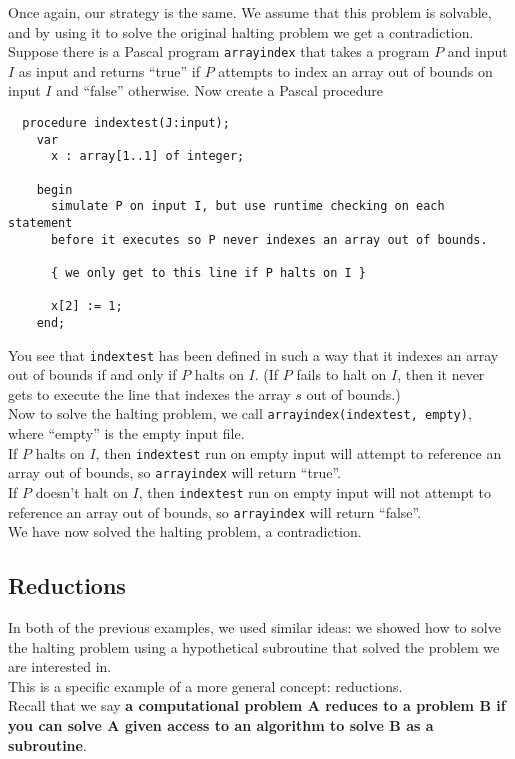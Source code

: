 \documentclass[12pt]{article}
\theoremstyle{plain}
\theoremstyle{definition}
\begin{document}
Once again, our strategy is the same.
We assume that this problem is solvable, and by using it to solve the original halting problem we get a contradiction.
Suppose there is a Pascal program \texttt{arrayindex} that takes a program $P$ and input $I$ as input and returns ``true'' if $P$ attempts to index an array out of bounds on input $I$ and ``false'' otherwise.
Now create a Pascal procedure
\begin{verbatim}
  procedure indextest(J:input);
    var
      x : array[1..1] of integer;

    begin
      simulate P on input I, but use runtime checking on each statement
      before it executes so P never indexes an array out of bounds.

      { we only get to this line if P halts on I }

      x[2] := 1;
    end;
\end{verbatim}

You see that \texttt{indextest} has been defined in such a way that it indexes an array out of bounds if and only if $P$ halts on $I$.
(If $P$ fails to halt on $I$, then it never gets to execute the line that indexes the array $s$ out of bounds.) \\

Now to solve the halting problem, we call \texttt{arrayindex(indextest, empty)}, where ``empty'' is the empty input file. \\
If $P$ halts on $I$, then \texttt{indextest} run on empty input will attempt to reference an array out of bounds, so \texttt{arrayindex} will return ``true''.  \\
If $P$ doesn't halt on $I$, then \texttt{indextest} run on empty input will not attempt to reference an array out of bounds, so \texttt{arrayindex} will return ``false''. \\
We have now solved the halting problem, a contradiction.

\subsection{Reductions}
In both of the previous examples, we used similar ideas: we showed how to solve the halting problem using a hypothetical subroutine that solved the problem we are interested in. \\

This is a specific example of a more general concept: reductions. \\
Recall that we say \textbf{a computational problem A reduces to a problem B if you can solve A given access to an algorithm to solve B as a subroutine}. \\
\end{document}
